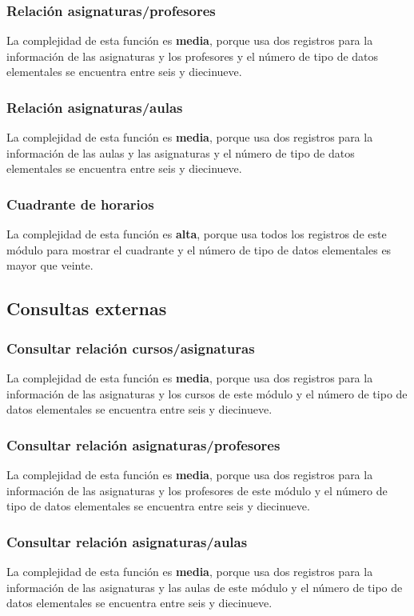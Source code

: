 \documentclass[11pt,a4paper,spanish,twoside]{book}
\begin{document}
\subsubsection{Relación asignaturas/profesores}
La complejidad de esta función es \textbf{media}, porque usa dos
registros para la información de las asignaturas y los profesores y el número
de tipo de datos elementales se encuentra entre seis y diecinueve. 

\subsubsection{Relación asignaturas/aulas}
La complejidad de esta función es \textbf{media}, porque usa dos
registros para la información de las aulas y las asignaturas y el número de
tipo de datos elementales se encuentra entre seis y diecinueve.

\subsubsection{Cuadrante de horarios}
La complejidad de esta función es \textbf{alta}, porque usa todos los
registros de este módulo para mostrar el cuadrante y el número de
tipo de datos elementales es mayor que veinte.

\subsection{Consultas externas}
\subsubsection{Consultar relación cursos/asignaturas}
La complejidad de esta función es \textbf{media}, porque usa dos
registros para la información de las asignaturas y los cursos de este
módulo y el número de tipo de datos elementales se encuentra entre seis y
diecinueve.

\subsubsection{Consultar relación asignaturas/profesores}
La complejidad de esta función es \textbf{media}, porque usa dos
registros para la información de las asignaturas y los profesores de este
módulo y el número de tipo de datos elementales se encuentra entre seis y
diecinueve.

\subsubsection{Consultar relación asignaturas/aulas}
La complejidad de esta función es \textbf{media}, porque usa dos
registros para la información de las asignaturas y las aulas de este
módulo y el número de tipo de datos elementales se encuentra entre seis y
diecinueve.
\end{document}
